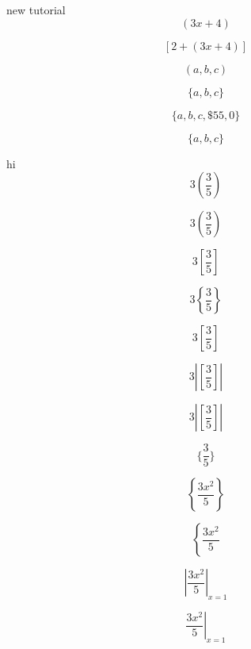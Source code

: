 \documentclass[11]{article}
\begin{document}
new tutorial 
$$(3x+4)$$

$$[2+(3x+4)]$$

$$(a,b,c)$$

$$\{a,b,c\}$$

$$\{a,b,c,\$55,0\}$$

$$\{a,b,c\}$$



hi
$$3(\frac{3}{5})$$

$$3\left(\frac{3}{5}\right)$$

$$3\left[\frac{3}{5}\right]$$

$$3\left\{\frac{3}{5}\right\}$$

$$3\left[\frac{3}{5}\right]$$

$$3|\left[\frac{3}{5}\right]|$$

$$3\left|\left[\frac{3}{5}\right]\right|$$

$$\{\frac{3}{5}\}$$

$$\left\{\frac{3x^2}{5}\right\}$$

$$\left\{\frac{3x^2}{5}\right.$$

$$\left| \frac{3x^2}{5}\right|_{x=1}$$

$$\left. \frac{3x^2}{5}\right|_{x=1}$$
\end{document}
